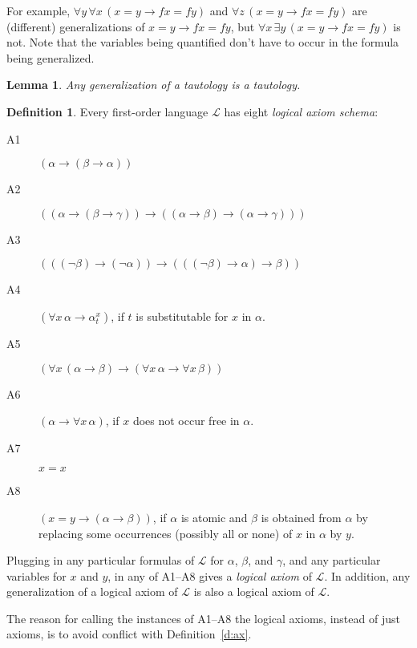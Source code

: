 \documentclass[12pt]{amsbook}
\theoremstyle{plain}
\newtheorem{lem}[thm]{Lemma}
\theoremstyle{definition}
\newtheorem{defn}{Definition}[chapter]
\theoremstyle{remark}
\begin{document}
For example,  $\forall y\, \forall x\, (x = y \to fx = fy)$ and  $\forall z\, (x = y \to fx = fy)$ are (different) generalizations of $x = y \to fx = fy$,  but $\forall x\, \exists y\,  (x = y \to fx = fy)$ is not.  Note that the variables being quantified don't have to occur in the formula being generalized.

\begin{lem} \label{l:gen}
Any generalization of a tautology is a tautology.
\end{lem}

\begin{defn} \label{d:axs} 
Every first-order language $\mathcal{L}$ has eight {\em logical axiom schema\/}:
\begin{description}
\item[A1] $(\alpha \to (\beta \to \alpha))$ 
\item[A2] $((\alpha \to (\beta \to \gamma)) \to ((\alpha \to \beta) \to (\alpha \to \gamma)))$ 
\item[A3] $(((\lnot \beta)\to (\lnot \alpha)) \to (((\lnot \beta) \to \alpha) \to \beta))$ 
\item[A4] $(\forall x \, \alpha \to \alpha^x_t)$,  if $t$ is substitutable for $x$ in $\alpha$. 
\item[A5] $(\forall x \, (\alpha \to \beta) \to (\forall x \, \alpha \to \forall x \, \beta))$ 
\item[A6] $(\alpha \to \forall x \, \alpha)$,  if $x$ does not occur free in $\alpha$. 
\item[A7] $x = x$ 
\item[A8] $(x = y \to (\alpha \to \beta))$,  if $\alpha$ is atomic and $\beta$ is obtained from $\alpha$ by replacing some occurrences (possibly all or none) of $x$ in $\alpha$ by $y$. 
\end{description}
Plugging in any particular formulas of $\mathcal{L}$ for $\alpha$,  $\beta$,  and $\gamma$,  and any particular variables for $x$ and $y$,  in any of A1--A8 gives a {\em logical axiom\/} of $\mathcal{L}$.  In addition,  any generalization of a logical axiom of $\mathcal{L}$ is also a logical axiom of $\mathcal{L}$.
\end{defn}

The reason for calling the instances of A1--A8 the logical axioms,  instead of just axioms,  is to avoid conflict with Definition~\ref{d:ax}.
\end{document}
